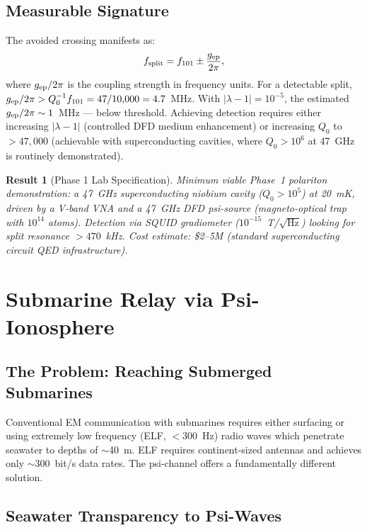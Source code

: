 \documentclass[aps,prd,twocolumn,superscriptaddress]{revtex4-2}
\newtheorem{result}{Result}
\begin{document}
\subsection{Measurable Signature}

The avoided crossing manifests as:
\begin{equation}
f_{\rm split} = f_{101} \pm \frac{g_{\rm ep}}{2\pi},
\end{equation}
where $g_{\rm ep}/2\pi$ is the coupling strength in frequency units.
For a detectable split, $g_{\rm ep}/2\pi > Q_0^{-1} f_{101} = 47/10{,}000 = 4.7$~MHz.
With $|\lambda-1| = 10^{-5}$, the estimated $g_{\rm ep}/2\pi \sim 1$~MHz ---
below threshold.  Achieving detection requires either increasing
$|\lambda-1|$ (controlled DFD medium enhancement) or increasing $Q_0$
to $> 47{,}000$ (achievable with superconducting cavities, where
$Q_0 > 10^6$ at 47~GHz is routinely demonstrated).

\begin{result}[Phase 1 Lab Specification]
Minimum viable Phase~1 polariton demonstration: a 47~GHz superconducting
niobium cavity ($Q_0 > 10^5$) at 20~mK, driven by a V-band VNA and a
47~GHz DFD psi-source (magneto-optical trap with $10^{14}$ atoms).
Detection via SQUID gradiometer ($10^{-15}$~T/$\sqrt{\text{Hz}}$)
looking for split resonance $> 470$~kHz.  Cost estimate: \$2--5M
(standard superconducting circuit QED infrastructure).
\end{result}

\section{Submarine Relay via Psi-Ionosphere}
\label{sec:submarine}

\subsection{The Problem: Reaching Submerged Submarines}

Conventional EM communication with submarines requires either surfacing
or using extremely low frequency (ELF, $< 300$~Hz) radio waves which
penetrate seawater to depths of $\sim$40~m.  ELF requires continent-sized
antennas and achieves only $\sim$300~bit/s data rates.  The psi-channel
offers a fundamentally different solution.

\subsection{Seawater Transparency to Psi-Waves}
\end{document}
